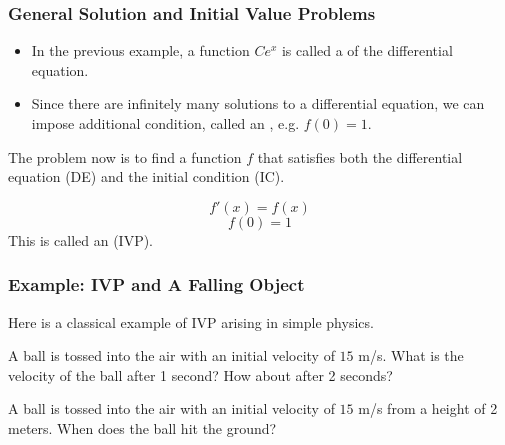 \documentclass[10pt,t,handout,ignorenonframetext,aspectratio=169]{beamer}
\begin{document}
\begin{frame}
  \frametitle{General Solution and Initial Value Problems}
  \begin{itemize}
  \item In the previous example, a function $Ce^x$ is called a  of the differential equation.
  \item Since there are infinitely many solutions to a differential equation,
    we can impose additional condition, called an ,
    e.g. $f(0)=1$.
  \end{itemize}
  The problem now is to find a function $f$ that satisfies both the
  differential equation (DE) and the initial condition (IC).

  \[
    f'(x) = f(x) \tag{DE}
  \]
  \[
    f(0) =1   \tag{IC}
  \]
  This is called an  (IVP).
\end{frame}

\begin{frame}
  \frametitle{Example: IVP and A Falling Object}
  Here is a classical example of IVP arising in simple physics. \\

  \vs
  \begin{question}
    A ball is tossed into the air with an initial velocity of $15$
    m/s. What is the velocity of the ball after 1 second? How about
    after 2 seconds?
  \end{question}

  \vfill
  \begin{question}
    A ball is tossed into the air with an initial velocity of $15$ m/s
    from a height of 2 meters. When does the ball hit the ground?
  \end{question}
  \vfill
\end{frame}
\end{document}
